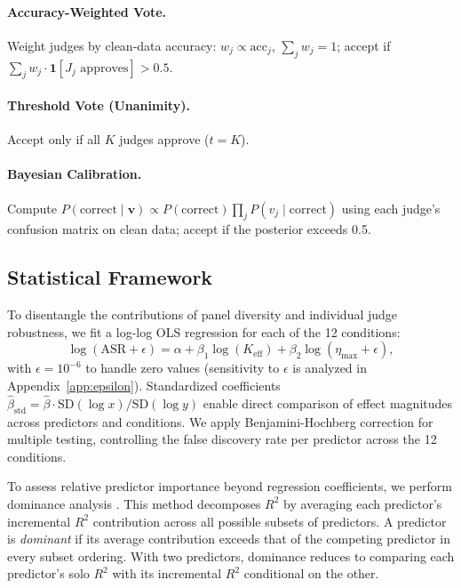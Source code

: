 \paragraph{Accuracy-Weighted Vote.} Weight judges by clean-data accuracy: $w_j \propto \mathrm{acc}_j$, $\sum_j w_j = 1$; accept if $\sum_j w_j \cdot \mathbf{1}[J_j \text{ approves}] > 0.5$.

\paragraph{Threshold Vote (Unanimity).} Accept only if all $K$ judges approve ($t = K$).

\paragraph{Bayesian Calibration.} Compute $P(\text{correct} \mid \mathbf{v}) \propto P(\text{correct}) \prod_j P(v_j \mid \text{correct})$ using each judge's confusion matrix on clean data; accept if the posterior exceeds 0.5.

\subsection{Statistical Framework}
\label{sec:stat_framework}

To disentangle the contributions of panel diversity and individual judge robustness, we fit a log-log OLS regression for each of the 12 conditions:
\begin{equation}
\label{eq:regression}
\log(\mathrm{ASR} + \epsilon) = \alpha + \beta_1 \log(K_{\mathrm{eff}}) + \beta_2 \log(\eta_{\max} + \epsilon),
\end{equation}
with $\epsilon = 10^{-6}$ to handle zero values (sensitivity to $\epsilon$ is analyzed in Appendix~\ref{app:epsilon}). Standardized coefficients $\hat{\beta}_{\mathrm{std}} = \hat{\beta} \cdot \mathrm{SD}(\log x) / \mathrm{SD}(\log y)$ enable direct comparison of effect magnitudes across predictors and conditions. We apply Benjamini-Hochberg correction for multiple testing, controlling the false discovery rate per predictor across the 12 conditions.

To assess relative predictor importance beyond regression coefficients, we perform dominance analysis \citep{budescu1993dominance}. This method decomposes $R^2$ by averaging each predictor's incremental $R^2$ contribution across all possible subsets of predictors. A predictor is \emph{dominant} if its average contribution exceeds that of the competing predictor in every subset ordering. With two predictors, dominance reduces to comparing each predictor's solo $R^2$ with its incremental $R^2$ conditional on the other.

